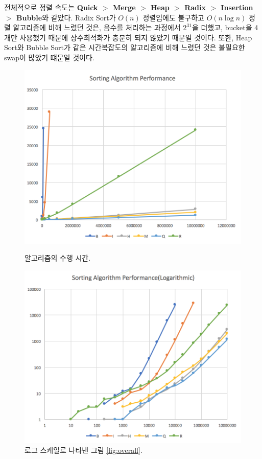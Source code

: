 \documentclass{article}
\begin{document}
	전체적으로 정렬 속도는
	\textbf{Quick $ > $ Merge $ > $ Heap $ > $ Radix $ > $ Insertion $ > $ Bubble}와 같았다.
	Radix Sort가 $ O(n) $ 정렬임에도 불구하고 $ O(n\log{n}) $ 정렬 알고리즘에 비해
	느렸던 것은, 음수를 처리하는 과정에서 $ 2^{31} $을 더했고,
	bucket을 4개만 사용했기 때문에 상수최적화가 충분히 되지 않았기 때문일 것이다.
	또한, Heap Sort와 Bubble Sort가 같은 시간복잡도의 알고리즘에 비해 느렸던 것은
	불필요한 swap이 많았기 떄문일 것이다.
	
	\begin{figure}[h]
		\centering
		\begin{minipage}{0.45\textwidth}
			\centering
			\includegraphics[width=\textwidth]{overall.png}
			\caption{알고리즘의 수행 시간.}
			\label{fig:overall}
		\end{minipage}
		\begin{minipage}{0.45\textwidth}
			\centering
			\includegraphics[width=\textwidth]{logarithmic.png}
			\caption{로그 스케일로 나타낸 그림 \ref{fig:overall}.}
			\label{fig:logarithmic}
		\end{minipage}
	\end{figure}
\end{document}
